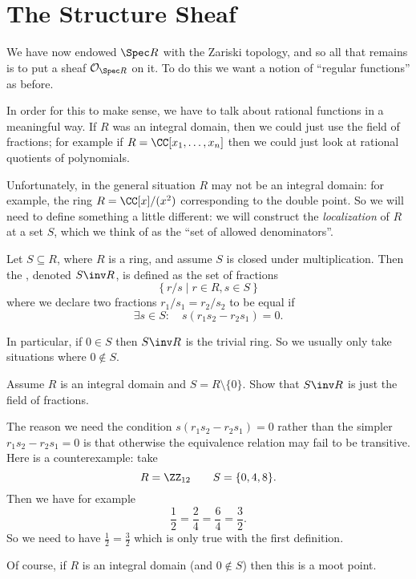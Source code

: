 \section{The Structure Sheaf}

We have now endowed $\Spec R$ with the Zariski topology,
and so all that remains is to put a sheaf $\OO_{\Spec R}$ on it.
To do this we want a notion of ``regular functions'' as before.

In order for this to make sense, we have to talk about rational
functions in a meaningful way.
If $R$ was an integral domain, then we could just use the field of fractions;
for example if $R = \CC[x_1, \dots, x_n]$ then we could just
look at rational quotients of polynomials.

Unfortunately, in the general situation $R$ may not be an integral domain:
for example, the ring $R = \CC[x] / (x^2)$ corresponding to the double point.
So we will need to define something a little different:
we will construct the \emph{localization} of $R$ at a set $S$,
which we think of as the ``set of allowed denominators''.

\begin{definition}
	Let $S \subseteq R$, where $R$ is a ring,
	and assume $S$ is closed under multiplication.
	Then the , denoted $S\inv R$,
	is defined as the set of fractions
	\[ \left\{ r/s \mid r \in R, s \in S \right\} \]
	where we declare two fractions $r_1 / s_1 = r_2 / s_2$ 
	to be equal if 
	\[ \exists s \in S : \quad s(r_1s_2 - r_2s_1) = 0. \]
\end{definition}
In particular, if $0 \in S$ then $S\inv R$ is the trivial ring.
So we usually only take situations where $0 \notin S$.
\begin{ques}
	Assume $R$ is an integral domain and $S = R \setminus \{0\}$.
	Show that $S\inv R$ is just the field of fractions.
\end{ques}

\begin{example}
	The reason we need the condition $s(r_1s_2 - r_2s_1) = 0$
	rather than the simpler $r_1s_2 - r_2s_1 = 0$ is that
	otherwise the equivalence relation may fail to be transitive.
	Here is a counterexample: take
	\[ R = \Zc{12} \qquad S = \{ 0, 4, 8 \}. \]
	Then we have for example
	\[ \frac12 = \frac24 = \frac64 = \frac32. \]
	So we need to have $\frac12=\frac32$ which is only true
	with the first definition.

	Of course, if $R$ is an integral domain (and $0\notin S$)
	then this is a moot point.
\end{example}

